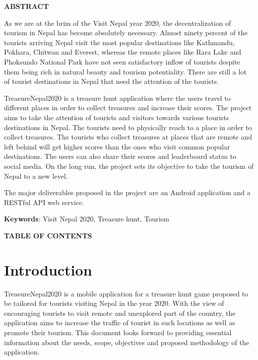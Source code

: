 \documentclass[12pt, a4paper, oneside]{article}
\begin{document}
\large
\begin{center}
	\textbf{ABSTRACT}
\end{center}

\normalsize
As we are at the brim of the Visit Nepal year 2020, the decentralization of tourism in Nepal has become absolutely necessary. Almost ninety percent of the tourists arriving Nepal visit the most popular destinations like Kathmandu, Pokhara, Chitwan and Everest, whereas the remote places like Rara Lake and Phoksundo National Park have not seen satisfactory inflow of tourists despite them being rich in natural beauty and tourism potentiality. There are still a lot of tourist destinations in Nepal that need the attention of the tourists.

TreasureNepal2020 is a treasure hunt application where the users travel to different places in order to collect treasures and increase their scores. The project aims to take the attention of tourists and visitors towards various tourists destinations in Nepal. The tourists need to physically reach to a place in order to collect treasures. The tourists who collect treasures at places that are remote and left behind will get higher scores than the ones who visit common popular destinations. The users can also share their scores and leaderboard status to social media. On the long run, the project sets its objective to take the tourism of Nepal to a new level.

The major deliverables proposed in the project are an Android application and a RESTful API web service.

\textbf{Keywords}: Visit Nepal 2020, Treasure hunt, Tourism\\

\break

\large
\begin{center}
	\textbf{TABLE OF CONTENTS}
\end{center}


\normalsize
\setlength{\cftbeforetoctitleskip}{0pt}
\renewcommand{\contentsname}{}
\tableofcontents

\break

\cfoot{\textbf{\thepage} /  \pageref{LastPage}}

\section{Introduction} 
TreasureNepal2020 is a mobile application for a treasure hunt game proposed to be tailored for tourists visiting Nepal in the year 2020. With the view of encouraging tourists to visit remote and unexplored part of the country, the application aims to increase the traffic of tourist in such locations as well as promote their tourism. This document looks forward to providing essential information about the needs, scope, objectives and proposed methodology of the application.
\end{document}
